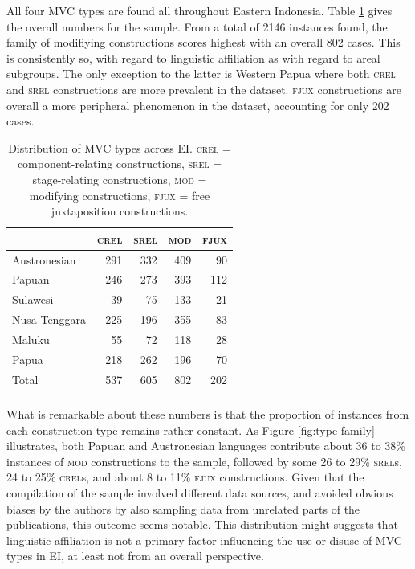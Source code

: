 All four MVC types are found all throughout Eastern Indonesia. Table \ref{table:MVCtypes_overview} gives the overall numbers for the sample. From a total of 2146 instances found, the family of modifiying constructions scores highest with an overall 802 cases. This is consistently so, with regard to linguistic affiliation as with regard to areal subgroups. The only exception to the latter is Western Papua where both \textsc{crel} and \textsc{srel} constructions are more prevalent in the dataset. \textsc{fjux} constructions are overall a more peripheral phenomenon in the dataset, accounting for only 202 cases.

\begin{table}
\begin{tabular}{lrrrr}
  \lsptoprule
 & \textsc{crel} & \textsc{srel} & \textsc{mod} & \textsc{fjux} \tabularnewline 
  \midrule
  Austronesian & 291 & 332 & 409 & 90 \tabularnewline
  Papuan & 246 & 273 &  393 &  112  \tabularnewline
   \midrule
  Sulawesi & 39 & 75 & 133 & 21 \tabularnewline
  Nusa Tenggara & 225 & 196 & 355 & 83 \tabularnewline
  Maluku & 55 & 72 & 118 & 28 \tabularnewline 
  Papua & 218 & 262 & 196 & 70 \tabularnewline 
\midrule
Total & 537 & 605 & 802 & 202 \tabularnewline
\lspbottomrule
\end{tabular}
\caption[Distribution of MVC types]{Distribution of MVC types across EI. \textsc{crel} = component-relating constructions, \textsc{srel} = stage-relating constructions, \textsc{mod} = modifying constructions, \textsc{fjux} = free juxtaposition constructions.}
\label{table:MVCtypes_overview}
\end{table}

What is remarkable about these numbers is that the proportion of instances from each construction type remains rather constant. As Figure \ref{fig:type-family} illustrates, both Papuan and Austronesian languages contribute about 36 to 38\% instances of \textsc{mod} constructions to the sample, followed by some 26 to 29\% \textsc{srel}s, 24 to 25\% \textsc{crel}s, and about 8 to 11\% \textsc{fjux} constructions. Given that the compilation of the sample involved different data sources, and avoided obvious biases by the authors by also sampling data from unrelated parts of the publications, this outcome seems notable. This distribution might suggests that linguistic affiliation is not a primary factor influencing the use or disuse of MVC types in EI, at least not from an overall perspective.

